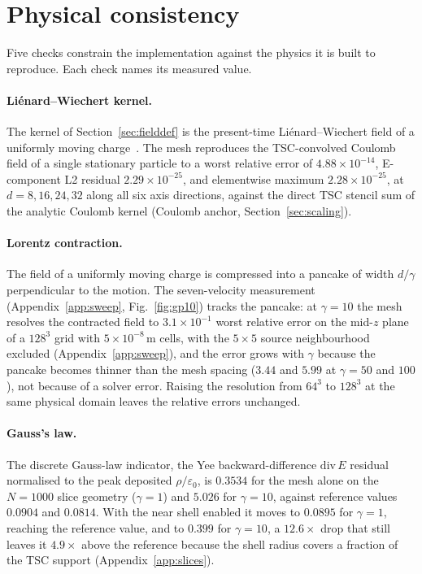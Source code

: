 \section{Physical consistency}
\label{sec:consistency}

Five checks constrain the implementation against the physics it is built to
reproduce. Each check names its measured value.

\paragraph{Li\'enard--Wiechert kernel.}
The kernel of Section~\ref{sec:fielddef} is the present-time
Li\'enard--Wiechert field of a uniformly moving charge~\citep{jackson2007}.
The mesh reproduces the TSC-convolved Coulomb field of a single stationary
particle to a worst relative error of $4.88\times10^{-14}$,
E-component L2 residual $2.29\times10^{-25}$, and elementwise maximum
$2.28\times10^{-25}$, at $d=8,16,24,32$ along all six axis
directions, against the direct TSC stencil sum of the analytic Coulomb
kernel (Coulomb anchor, Section~\ref{sec:scaling}).

\paragraph{Lorentz contraction.}
The field of a uniformly moving charge is compressed into a pancake of
width $d/\gamma$ perpendicular to the motion. The seven-velocity
measurement (Appendix~\ref{app:sweep}, Fig.~\ref{fig:gp10}) tracks the
pancake: at $\gamma=10$ the mesh resolves the contracted field to
$3.1\times10^{-1}$ worst relative error on the mid-$z$ plane of a
$128^3$ grid with $5\times10^{-8}$\,m cells, with the $5\times5$ source
neighbourhood excluded (Appendix~\ref{app:sweep}), and the error grows with
$\gamma$ because the pancake becomes thinner than the mesh spacing
($3.44$ and $5.99$ at $\gamma=50$ and $100$), not because of a solver
error. Raising the resolution from $64^3$ to $128^3$ at the same physical
domain leaves the relative errors unchanged.

\paragraph{Gauss's law.}
The discrete Gauss-law indicator, the Yee backward-difference
$\mathrm{div}\,E$ residual normalised to the peak deposited
$\rho/\varepsilon_0$, is $0.3534$ for the mesh alone on the $N=1000$ slice
geometry ($\gamma=1$) and $5.026$ for $\gamma=10$, against reference values
$0.0904$ and $0.0814$. With the near shell enabled it moves to $0.0895$ for
$\gamma=1$, reaching the reference value, and to $0.399$ for $\gamma=10$,
a $12.6\times$ drop that still leaves it $4.9\times$ above the reference
because the shell radius covers a fraction of the TSC support
(Appendix~\ref{app:slices}).

